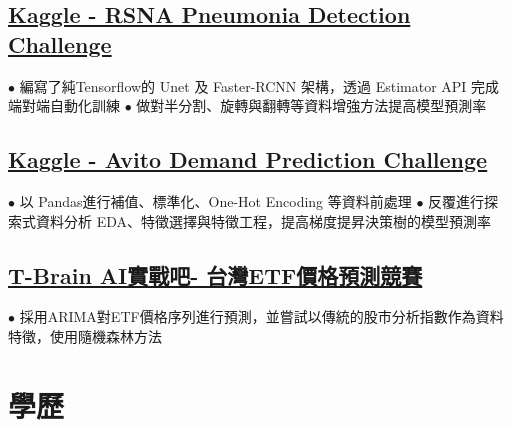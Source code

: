 \documentclass[11pt,a4paper]{moderncv}
\begin{document}
\subsection{\href{https://www.kaggle.com/c/rsna-pneumonia-detection-challenge}{\small Kaggle - RSNA Pneumonia Detection Challenge}}
{\footnotesize{$\bullet$ 編寫了純Tensorflow的 Unet 及 Faster-RCNN 架構，透過 Estimator API 完成端對端自動化訓練
\newline $\bullet$ 做對半分割、旋轉與翻轉等資料增強方法提高模型預測率}}

\subsection{\href{https://www.kaggle.com/c/avito-demand-prediction}{\small Kaggle - Avito Demand Prediction Challenge}}
{\footnotesize{$\bullet$ 以 Pandas進行補值、標準化、One-Hot Encoding 等資料前處理
\newline $\bullet$ 反覆進行探索式資料分析 EDA、特徵選擇與特徵工程，提高梯度提昇決策樹的模型預測率}}

\subsection{\href{https://tbrain.trendmicro.com.tw/Competitions/Details/2}{\small T-Brain AI實戰吧- 台灣ETF價格預測競賽}}
{\footnotesize{$\bullet$ 採用ARIMA對ETF價格序列進行預測，並嘗試以傳統的股市分析指數作為資料特徵，使用隨機森林方法}}
\vspace{-0.7\baselineskip}

\section{學歷}
\vspace{-0.7\baselineskip}
\end{document}
